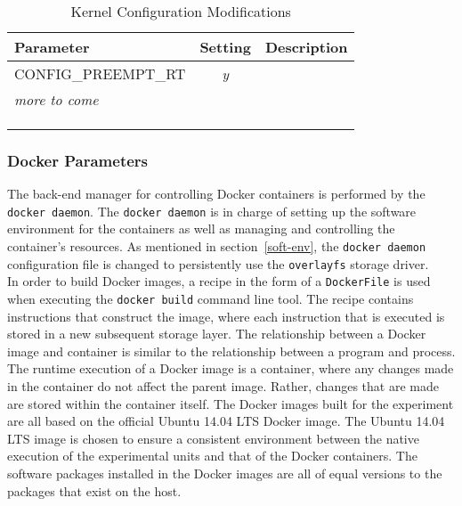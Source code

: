 \begin{table}[]
\begin{tabular}{|l|c|l|}
\hline
Parameter             & \multicolumn{1}{l|}{Setting} & Description \\ \hline
CONFIG\_PREEMPT\_RT   & \textit{y}                   &             \\ \hline
\textit{more to come} & \textit{}                    &             \\ \hline
                      & \textit{}                    &             \\ \hline
                      & \textit{}                    &             \\ \hline
                      & \textit{}                    &             \\ \hline
\end{tabular}
\centering
\caption{Kernel Configuration Modifications}
\label{kernel-config}
\end{table}


\subsubsection{Docker Parameters}
The back-end manager for controlling Docker containers is performed by the \texttt{docker daemon}. The \texttt{docker daemon} is in charge of setting up the software environment for the containers as well as managing and controlling the container's resources. As mentioned in section~\ref{soft-env}, the \texttt{docker daemon} configuration file is changed to persistently use the \texttt{overlayfs} storage driver.\\

In order to build Docker images, a recipe in the form of a \texttt{DockerFile} is used when executing the \texttt{docker build} command line tool. The recipe contains instructions that construct the image, where each instruction that is executed is stored in a new subsequent storage layer. The relationship between a Docker image and container is similar to the relationship between a program and process. The runtime execution of a Docker image is a container, where any changes made in the container do not affect the parent image. Rather, changes that are made are stored within the container itself. The Docker images built for the experiment are all based on the official Ubuntu 14.04 LTS Docker image. The Ubuntu 14.04 LTS image is chosen to ensure a consistent environment between the native execution of the experimental units and that of the Docker containers. The software packages installed in the Docker images are all of equal versions to the packages that exist on the host. \\

